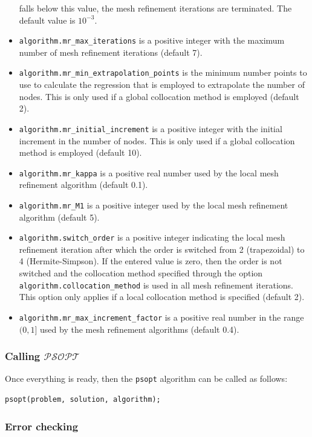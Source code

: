 \documentclass[a4paper,11pt]{report}    %
\newcommand{\psopt}{$\mathcal{PSOPT}$\,}  %
\begin{document}
\begin{itemize}
falls below this value, the mesh refinement iterations are terminated. The default value is $10^{-3}$.
\item \verb|algorithm.mr_max_iterations| is a positive integer with the maximum number of mesh refinement iterations (default 7).
\item \verb|algorithm.mr_min_extrapolation_points| is the minimum number points to use to calculate the regression that is employed to extrapolate
the number of nodes. This is only used if a global collocation method is employed (default 2).
\item \verb|algorithm.mr_initial_increment| is a positive integer with the initial increment in the number of nodes. This is only used if a global collocation method
is employed (default 10).
\item \verb|algorithm.mr_kappa| is a positive real number used by the local mesh refinement algorithm (default  0.1).
\item \verb|algorithm.mr_M1| is a positive integer used by the local mesh refinement algorithm (default 5).
\item \verb|algorithm.switch_order| is a positive integer indicating the local mesh refinement iteration after which the order is switched from 2 (trapezoidal) to 4 (Hermite-Simpson).
If the entered value is zero, then the order is not switched and the collocation method specified through the option \verb|algorithm.collocation_method| is used in all mesh refinement iterations. This option
only applies if a local collocation method is specified (default 2).
\item \verb|algorithm.mr_max_increment_factor| is  a positive real number in the range $(0,1]$ used by the mesh refinement algorithms (default 0.4).


\end{itemize}


\subsubsection{Calling \psopt}

Once everything is ready, then the \verb|psopt| algorithm can be called as follows:


\begin{verbatim}
psopt(problem, solution, algorithm);
\end{verbatim}

\subsubsection{Error checking}
\end{document}

